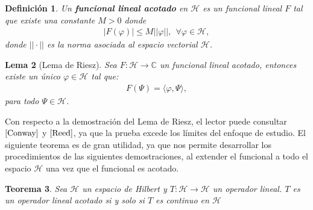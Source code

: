 \documentclass[12pt]{article}
\newtheorem{teo}{Teorema}[section]
\newtheorem{defn}[teo]{Definición}
\newtheorem{lem}[teo]{Lema}
\theoremstyle{definition}
\newcommand*{\field}[1]{\mathbb{#1}}
\begin{document}
\begin{defn}
    Un \textbf{funcional lineal acotado} en $\mathcal{H}$ es un funcional lineal $F$ tal que existe una constante $M>0$ donde
    \begin{align*}
        |F(\varphi)| \leq M ||\varphi||,\:\: \forall \varphi \in\mathcal{H},
    \end{align*}
    donde $||\cdot||$ es la norma asociada al espacio vectorial $\mathcal{H}$.
\end{defn}
\begin{lem}[Lema de Riesz]
    Sea $F:\mathcal{H}\longrightarrow\field{C}$ un funcional lineal acotado, entonces existe un único $\varphi \in \mathcal{H}$ tal que:
    \begin{align*}
        F(\Psi) = \langle\varphi,\Psi\rangle,
    \end{align*}
    para todo $\Psi \in \mathcal{H}$.
    \label{lem:LdeRiesz}
\end{lem}
\noindent
Con respecto a la demostración del Lema de Riesz, el lector puede consultar  $\cite[\:\text{Teorema\: 3.4}, \text{p.13}]{Conway}$ y $\cite[\:\text{Teorema\:II.4},  \text{p.43}]{Reed}$, ya que la prueba excede los límites del enfoque de estudio. El siguiente teorema es de gran utilidad, ya que nos permite desarrollar los procedimientos de las siguientes demostraciones, al extender el funcional a todo el espacio $\mathcal{H}$ una vez que el funcional es acotado. 
\begin{teo}
    Sea $\mathcal{H}$ un espacio de Hilbert y $T:\mathcal{H}\longrightarrow\mathcal{H}$ un operador lineal. $T$ es un operador lineal acotado si y solo si $T$ es continuo en $\mathcal{H}$ 
    \label{teo:ExtAcotamiento}
\end{teo}
\end{document}
